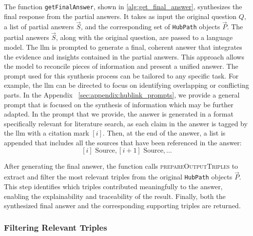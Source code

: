 The function \texttt{getFinalAnswer}, shown in \autoref{alg:get_final_answer}, synthesizes the final response from the partial answers. It takes as input the original question \(Q\), a list of partial answers \(\vec{S}\), and the corresponding set of \texttt{HubPath} objects \(\vec{P}\). The partial answers \(\vec{S}\), along with the original question, are passed to a language model. The \gls{llm} is prompted to generate a final, coherent answer that integrates the evidence and insights contained in the partial answers. This approach allows the model to reconcile pieces of information and present a unified answer. The prompt used for this synthesis process can be tailored to any specific task. For example, the \gls{llm} can be directed to focus on identifying overlapping or conflicting parts. In the Appendix ~\ref{sec:appendix:hublink_prompts}, we provide a general prompt that is focused on the synthesis of information which may be further adapted. In the prompt that we provide, the answer is generated in a format specifically relevant for literature search, as each claim in the answer is tagged by the \gls{llm} with a citation mark $[i]$. Then, at the end of the answer, a list is appended that includes all the sources that have been referenced in the answer: 
$$[i]\text{ Source}, [i+1] \text{ Source}, \dots$$

After generating the final answer, the function calls \textsc{prepareOutputTriples} to extract and filter the most relevant triples from the original \texttt{HubPath} objects \(\vec{P}\). This step identifies which triples contributed meaningfully to the answer, enabling the explainability and traceability of the result. Finally, both the synthesized final answer and the corresponding supporting triples are returned.


\subsubsection{Filtering Relevant Triples}
\label{sec:selecting_relevant_triples}

